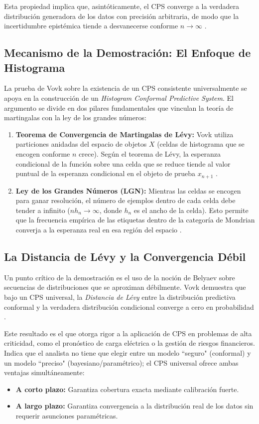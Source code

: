 Esta propiedad implica que, asintóticamente, el CPS converge a la verdadera distribución generadora de los datos con precisión arbitraria, de modo que la incertidumbre epistémica tiende a desvanecerse conforme $n \to \infty$ \parencite{Vovk2019}. 

\subsection{Mecanismo de la Demostración: El Enfoque de Histograma}

La prueba de Vovk sobre la existencia de un CPS consistente universalmente se apoya en la construcción de un \textit{Histogram Conformal Predictive System}. El argumento se divide en dos pilares fundamentales que vinculan la teoría de martingalas con la ley de los grandes números:

\begin{enumerate}
    \item \textbf{Teorema de Convergencia de Martingalas de Lévy:} Vovk utiliza particiones anidadas del espacio de objetos $X$ (celdas de histograma que se encogen conforme $n$ crece). Según el teorema de Lévy, la esperanza condicional de la función sobre una celda que se reduce tiende al valor puntual de la esperanza condicional en el objeto de prueba $x_{n+1}$ \parencite{Vovk2019}.
    
    \item \textbf{Ley de los Grandes Números (LGN):} Mientras las celdas se encogen para ganar resolución, el número de ejemplos dentro de cada celda debe tender a infinito ($nh_n \to \infty$, donde $h_n$ es el ancho de la celda). Esto permite que la frecuencia empírica de las etiquetas dentro de la categoría de Mondrian converja a la esperanza real en esa región del espacio \parencite{Vovk2019}.
\end{enumerate}

\subsection{La Distancia de Lévy y la Convergencia Débil}

Un punto crítico de la demostración es el uso de la noción de Belyaev sobre secuencias de distribuciones que se aproximan débilmente. Vovk demuestra que bajo un CPS universal, la \textit{Distancia de Lévy} entre la distribución predictiva conformal y la verdadera distribución condicional converge a cero en probabilidad \cite{Vovk2019}. 

Este resultado es el que otorga rigor a la aplicación de CPS en problemas de alta criticidad, como el pronóstico de carga eléctrica o la gestión de riesgos financieros. Indica que el analista no tiene que elegir entre un modelo ``seguro" (conformal) y un modelo ``preciso" (bayesiano/paramétrico); el CPS universal ofrece ambas ventajas simultáneamente:
\begin{itemize}
    \item \textbf{A corto plazo:} Garantiza cobertura exacta mediante calibración fuerte.
    \item \textbf{A largo plazo:} Garantiza convergencia a la distribución real de los datos sin requerir asunciones paramétricas.
\end{itemize}

